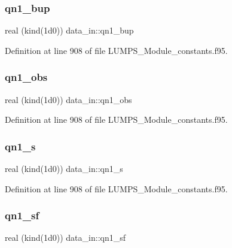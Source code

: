 \mbox{\label{namespacedata__in_a7c4bf0a5d9721f577e74c835d3513036}} 
\subsubsection{\texorpdfstring{qn1\+\_\+bup}{qn1\_bup}}
{\footnotesize\ttfamily real (kind(1d0)) data\+\_\+in\+::qn1\+\_\+bup}



Definition at line 908 of file L\+U\+M\+P\+S\+\_\+\+Module\+\_\+constants.\+f95.

\mbox{\label{namespacedata__in_ae357494342c4cf48a962c4361d7c4459}} 
\subsubsection{\texorpdfstring{qn1\+\_\+obs}{qn1\_obs}}
{\footnotesize\ttfamily real (kind(1d0)) data\+\_\+in\+::qn1\+\_\+obs}



Definition at line 908 of file L\+U\+M\+P\+S\+\_\+\+Module\+\_\+constants.\+f95.

\mbox{\label{namespacedata__in_ae21258de695f82699606f7ced498693d}} 
\subsubsection{\texorpdfstring{qn1\+\_\+s}{qn1\_s}}
{\footnotesize\ttfamily real (kind(1d0)) data\+\_\+in\+::qn1\+\_\+s}



Definition at line 908 of file L\+U\+M\+P\+S\+\_\+\+Module\+\_\+constants.\+f95.

\mbox{\label{namespacedata__in_af270ed598adad800b8338f7a0700183f}} 
\subsubsection{\texorpdfstring{qn1\+\_\+sf}{qn1\_sf}}
{\footnotesize\ttfamily real (kind(1d0)) data\+\_\+in\+::qn1\+\_\+sf}



